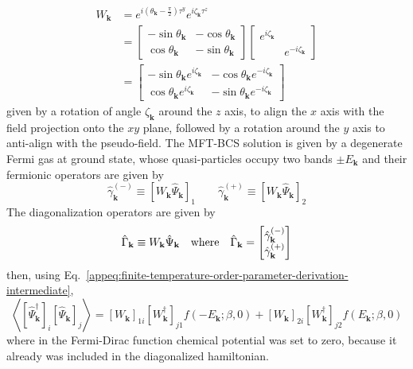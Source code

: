 \begin{align}
	W_\mathbf{k} &= e^{i \left(\theta_\mathbf{k} - \frac{\pi}{2}\right) \tau^y} e^{i \zeta_\mathbf{k} \tau^z} \nonumber \\
	&= \begin{bmatrix}
		-\sin\theta_\mathbf{k}  & -\cos\theta_\mathbf{k}  \\ 
		\cos\theta_\mathbf{k}  & -\sin\theta_\mathbf{k} 
	\end{bmatrix} \begin{bmatrix}
		e^{i\zeta_\mathbf{k} } & \\ & e^{-i\zeta_\mathbf{k} }
	\end{bmatrix} \nonumber \\
	&= \begin{bmatrix}
		-\sin\theta_\mathbf{k}  e^{i\zeta_\mathbf{k} } & -\cos\theta_\mathbf{k}  e^{-i\zeta_\mathbf{k} }  \\ 
		\cos\theta_\mathbf{k}  e^{i\zeta_\mathbf{k} } & -\sin\theta_\mathbf{k}  e^{-i\zeta_\mathbf{k} } 
	\end{bmatrix} \label{eq:extended-hubbard-bogoliubov-W-diagonalizer-explicit}
\end{align}
given by a rotation of angle $\zeta_\mathbf{k}$ around the $z$ axis, to align the $x$ axis with the field projection onto the $xy$ plane, followed by a rotation around the $y$ axis to anti-align with the pseudo-field. The MFT-BCS solution is given by a degenerate Fermi gas at ground state, whose quasi-particles occupy two bands $\pm E_\mathbf{k}$ and their fermionic operators are given by
\[
	\hat \gamma_\mathbf{k}^{(-)} \equiv \left[
		W_\mathbf{k} \hat \Psi_\mathbf{k}
	\right]_1
	\qquad
	\hat \gamma_\mathbf{k}^{(+)} \equiv \left[
		W_\mathbf{k} \hat \Psi_\mathbf{k}
	\right]_2
\]
The diagonalization operators are given by
\[
	\hat\Gamma_\mathbf{k} \equiv W_\mathbf{k} \hat\Psi_\mathbf{k}
	\qq{where}
	\hat\Gamma_\mathbf{k} = \begin{bmatrix}
		\hat \gamma_\mathbf{k}^{(-)} \\ \hat \gamma_\mathbf{k}^{(+)}
	\end{bmatrix}
\]
then, using Eq.~\eqref{appeq:finite-temperature-order-parameter-derivation-intermediate}, 
\[
	\left\langle [\hat \Psi_\mathbf{k}^\dagger]_i [\hat \Psi_\mathbf{k}]_j \right\rangle = [W_\mathbf{k}]_{1 i} [W_\mathbf{k}^\dagger]_{j 1} f\left( -E_\mathbf{k}; \beta,0 \right) + [W_\mathbf{k}]_{2 i} [W_\mathbf{k}^\dagger]_{j 2} f\left( E_\mathbf{k}; \beta,0 \right)
\]
where in the Fermi-Dirac function chemical potential was set to zero, because it already was included in the diagonalized hamiltonian.

